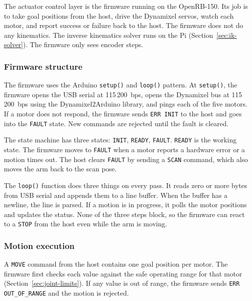 \label{sec:actuator-control}

The actuator control layer is the firmware running on the OpenRB-150.
Its job is to take goal positions from the host, drive the Dynamixel
servos, watch each motor, and report success or failure back to the
host. The firmware does not do any kinematics. The inverse kinematics
solver runs on the Pi (Section~\ref{sec:ik-solver}). The firmware
only sees encoder steps.

\subsubsection*{Firmware structure}

The firmware uses the Arduino \texttt{setup()} and \texttt{loop()}
pattern.
At \texttt{setup()}, the firmware opens the USB serial at 115\,200~bps,
opens the Dynamixel bus at 115\,200~bps using the Dynamixel2Arduino library,
and pings each of the five motors. If a motor does not respond, the
firmware sends \texttt{ERR INIT} to the host and goes into the
\texttt{FAULT} state. New commands are rejected until the fault is
cleared.

The state machine has three states: \texttt{INIT}, \texttt{READY},
\texttt{FAULT}. \texttt{READY} is the working state. The firmware
moves to \texttt{FAULT} when a motor reports a hardware error or a
motion times out. The host clears \texttt{FAULT} by sending a
\texttt{SCAN} command, which also moves the arm back to the scan pose.

The \texttt{loop()} function does three things on every pass. It
reads zero or more bytes from USB serial and appends them to a line
buffer. When the buffer has a newline, the line is parsed. If a
motion is in progress, it polls the motor positions and updates the
status. None of the three steps block, so the firmware can react to a
\texttt{STOP} from the host even while the arm is moving.

\subsubsection*{Motion execution}

A \texttt{MOVE} command from the host contains one goal position per
motor. The firmware first checks each value against the safe operating
range for that motor (Section~\ref{sec:joint-limits}). If any value
is out of range, the firmware sends \texttt{ERR OUT\_OF\_RANGE} and
the motion is rejected.

